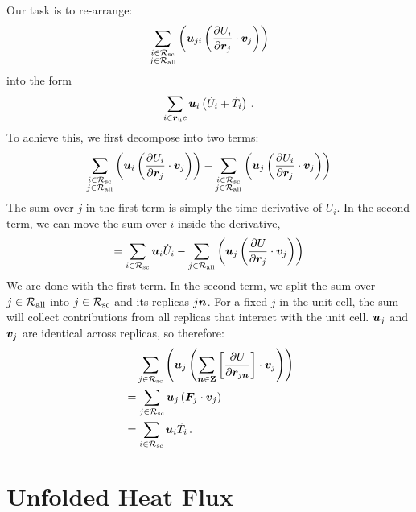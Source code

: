 Our task is to re-arrange:
\begin{equation}
	\sum_{\substack{i \in \mathcal{R_{\text{sc}}} \\ j \in \mathcal{R_{\text{all}}}}} \left(\boldsymbol{u}_{ji} \left(\frac{\partial U_{i}}{\partial \boldsymbol{r}_{j}} \cdot \boldsymbol{v}_j\right) \right)
\end{equation}
into the form
\begin{equation}
	\sum_{i \in \boldsymbol{r}_uc} \boldsymbol{u}_i \left(\dot U_i + \dot T_i \right) \, .
\end{equation}
To achieve this, we first decompose into two terms:
\begin{align}
	\sum_{\substack{i \in \mathcal{R_{\text{sc}}} \\ j \in \mathcal{R_{\text{all}}}}} \left(\boldsymbol{u}_{i} \left(\frac{\partial U_{i}}{\partial \boldsymbol{r}_{j}} \cdot \boldsymbol{v}_j\right) \right)
	- 
	\sum_{\substack{i \in \mathcal{R_{\text{sc}}} \\ j \in \mathcal{R_{\text{all}}}}} \left(\boldsymbol{u}_{j} \left(\frac{\partial U_{i}}{\partial \boldsymbol{r}_{j}} \cdot \boldsymbol{v}_j\right) \right)
\end{align}
The sum over $j$ in the first term is simply the time-derivative of $U_i$. In the second term, we can move the sum over $i$ inside the derivative,
\begin{align}
	= \sum_{i \in \mathcal{R_{\text{sc}}}} \boldsymbol{u}_{i} \dot U_i
	- 
	\sum_{j \in \mathcal{R_{\text{all}}}} \left(\boldsymbol{u}_{j} \left(\frac{\partial U_{}}{\partial \boldsymbol{r}_{j}} \cdot \boldsymbol{v}_j\right) \right)
\end{align}
We are done with the first term.
In the second term, we split the sum over $j \in \mathcal{R_{\text{all}}}$ into $j \in \mathcal{R_{\text{sc}}}$ and its replicas $j\boldsymbol{n}$. For a fixed $j$ in the unit cell, the sum will collect contributions from all replicas that interact with the unit cell. $\boldsymbol{u}_j$ and $\boldsymbol{v}_j$ are identical across replicas, so therefore:
\begin{align}
	&- \sum_{j \in \mathcal{R_{\text{sc}}}} \left(\boldsymbol{u}_{j} \left(\sum_{\boldsymbol{n} \in {\bf Z}} \left[\frac{\partial U_{}}{\partial \boldsymbol{r}_{j\boldsymbol{n}}} \right] \cdot \boldsymbol{v}_j\right) \right) \\
	&= \sum_{j \in \mathcal{R_{\text{sc}}}} \boldsymbol{u}_j \left(\boldsymbol{F}_j \cdot \boldsymbol{v}_j\right) \\
	&= \sum_{i \in \mathcal{R_{\text{sc}}}} \boldsymbol{u}_i \dot T_i \, .
\end{align}

\section{Unfolded Heat Flux}
\label{sec:si-hf_unfolded}

